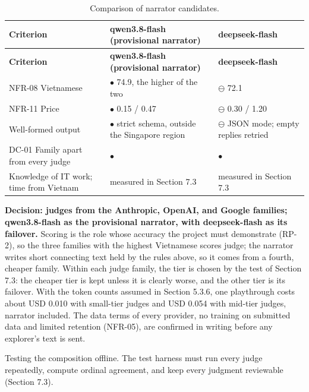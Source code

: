{\small
\begin{longtable}{|>{\raggedright\arraybackslash}p{}|>{\raggedright\arraybackslash}p{}|>{\raggedright\arraybackslash}p{}|}
\caption{Comparison of narrator candidates.} \\
\hline
\textbf{Criterion} & \textbf{qwen3.8-flash (provisional narrator)} & \textbf{deepseek-flash} \\ \hline
\endfirsthead
\hline
\textbf{Criterion} & \textbf{qwen3.8-flash (provisional narrator)} & \textbf{deepseek-flash} \\ \hline
\endhead
NFR-08 Vietnamese & $\bullet$ 74.9, the higher of the two & $\ominus$ 72.1 \\ \hline
NFR-11 Price & $\bullet$ 0.15 / 0.47 & $\ominus$ 0.30 / 1.20 \\ \hline
Well-formed output & $\bullet$ strict schema, outside the Singapore region & $\ominus$ JSON mode; empty replies retried \\ \hline
DC-01 Family apart from every judge & $\bullet$ & $\bullet$ \\ \hline
Knowledge of IT work; time from Vietnam & measured in Section 7.3 & measured in Section 7.3 \\ \hline
\end{longtable}
}

\textbf{Decision: judges from the Anthropic, OpenAI, and Google families; qwen3.8-flash as the provisional narrator, with deepseek-flash as its failover.} Scoring is the role whose accuracy the project must demonstrate (RP-2), so the three families with the highest Vietnamese scores judge; the narrator writes short connecting text held by the rules above, so it comes from a fourth, cheaper family. Within each judge family, the tier is chosen by the test of Section 7.3: the cheaper tier is kept unless it is clearly worse, and the other tier is its failover. With the token counts assumed in Section 5.3.6, one playthrough costs about USD 0.010 with small-tier judges and USD 0.054 with mid-tier judges, narrator included. The data terms of every provider, no training on submitted data and limited retention (NFR-05), are confirmed in writing before any explorer's text is sent.

Testing the composition offline. The test harness must run every judge repeatedly, compute ordinal agreement, and keep every judgment reviewable (Section 7.3).

